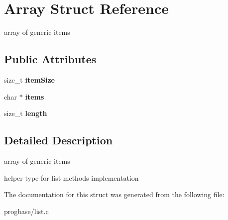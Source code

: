 \hypertarget{struct_array}{}\section{Array Struct Reference}
\label{struct_array}


array of generic items  


\subsection*{Public Attributes}
\begin{DoxyCompactItemize}
\item 
\mbox{\label{struct_array_aeb4a476d55974e53ff875763edbe2763}} 
size\+\_\+t {\bfseries item\+Size}
\item 
\mbox{\label{struct_array_a0f6d220f87a3150b00924b6049e793f1}} 
char $\ast$ {\bfseries items}
\item 
\mbox{\label{struct_array_a2947879469cf135de37520446a05c1d2}} 
size\+\_\+t {\bfseries length}
\end{DoxyCompactItemize}


\subsection{Detailed Description}
array of generic items 

helper type for list methods implementation 

The documentation for this struct was generated from the following file\+:\begin{DoxyCompactItemize}
\item 
progbase/list.\+c\end{DoxyCompactItemize}
